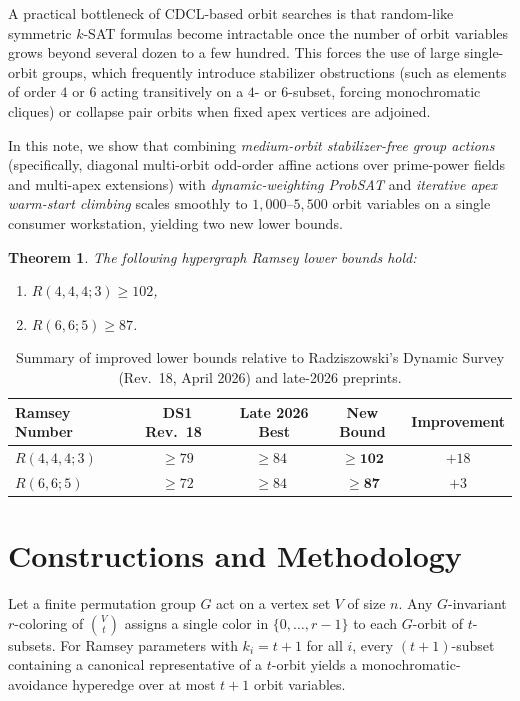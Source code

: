 \documentclass[11pt,a4paper]{article}
\newtheorem{theorem}{Theorem}
\begin{document}
A practical bottleneck of CDCL-based orbit searches is that random-like symmetric $k$-SAT formulas become intractable once the number of orbit variables grows beyond several dozen to a few hundred. This forces the use of large single-orbit groups, which frequently introduce stabilizer obstructions (such as elements of order $4$ or $6$ acting transitively on a $4$- or $6$-subset, forcing monochromatic cliques) or collapse pair orbits when fixed apex vertices are adjoined.

In this note, we show that combining \emph{medium-orbit stabilizer-free group actions} (specifically, diagonal multi-orbit odd-order affine actions over prime-power fields and multi-apex extensions) with \emph{dynamic-weighting ProbSAT} and \emph{iterative apex warm-start climbing} scales smoothly to $1{,}000\text{--}5{,}500$ orbit variables on a single consumer workstation, yielding two new lower bounds.

\begin{theorem}\label{thm:main}
The following hypergraph Ramsey lower bounds hold:
\begin{enumerate}
    \item $R(4,4,4;3) \ge 102$,
    \item $R(6,6;5) \ge 87$.
\end{enumerate}
\end{theorem}

\begin{table}[h]
\centering
\begin{tabular}{lcccc}
\toprule
Ramsey Number & DS1 Rev.~18~\cite{RadziszowskiDS1} & Late 2026 Best & New Bound & Improvement \\
\midrule
$R(4,4,4;3)$ & $\ge 79$ & $\ge 84$~\cite{Yang2026} & $\mathbf{\ge 102}$ & $+18$ \\
$R(6,6;5)$   & $\ge 72$ & $\ge 84$~\cite{Lysenstoen2026} & $\mathbf{\ge 87}$ & $+3$ \\
\bottomrule
\end{tabular}
\caption{Summary of improved lower bounds relative to Radziszowski's Dynamic Survey (Rev.~18, April 2026) and late-2026 preprints.}
\label{tab:summary}
\end{table}

\section{Constructions and Methodology}

Let a finite permutation group $G$ act on a vertex set $V$ of size $n$. Any $G$-invariant $r$-coloring of $\binom{V}{t}$ assigns a single color in $\{0, \dots, r-1\}$ to each $G$-orbit of $t$-subsets. For Ramsey parameters with $k_i = t+1$ for all $i$, every $(t+1)$-subset containing a canonical representative of a $t$-orbit yields a monochromatic-avoidance hyperedge over at most $t+1$ orbit variables.
\end{document}
